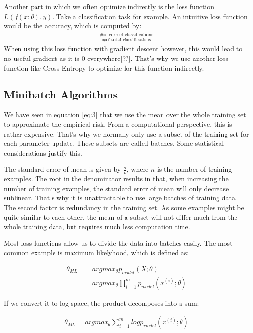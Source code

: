 Another part in which we often optimize indirectly is the loss function
$L(f(x;\theta), y)$. Take a classification task for example. An intuitive loss
function would be the accuracy, which is computed by:
\begin{align}
    \frac{\textrm{\# of correct classifications}}{\textrm{\# of total classifications}}
\end{align}
When using this loss function with gradient descent however, this would lead to
no useful gradient as it is 0 everywhere[??]. That's why we use another loss
function like Cross-Entropy to optimize for this function indirectly.

\subsection{Minibatch Algorithms}\label{sub:Minibatch}
We have seen in equation \ref{eq:3} that we use the mean over the whole training
set to approximate the empirical risk. From a computational perspective, this is
rather expensive. That's why we normally only use a subset of the training set
for each parameter update. These subsets are called batches. Some statistical
considerations justify this.

The standard error of mean is given by $\frac{\sigma}{n}$, where $n$ is the
number of training examples. The root in the denominator results in that, when
increasing the number of training examples, the standard error of mean will
only decrease sublinear. That's why it is unattractable to use large batches of
training data. The second factor is redundancy in the training set. As some
examples might be quite similar to each other, the mean of a subset will not
differ much from the whole training data, but requires much less computation
time.

Most loss-functions allow us to divide the data into batches easily. The most
common example is maximum likelyhood, which is defined as:

\begin{align}
    \theta_{ML}
    & = argmax_{\theta} p_{model}(X; \theta) \\
    & = argmax_{\theta} \prod_{i=1}^m p_{model}(x^{(i)}; \theta)
\end{align}

If we convert it to log-space, the product decomposes into a sum:

\begin{align}
    \theta_{ML} = argmax_{\theta} \sum_{i=1}^m log p_{model}(x^{(i)}; \theta)
\end{align}


